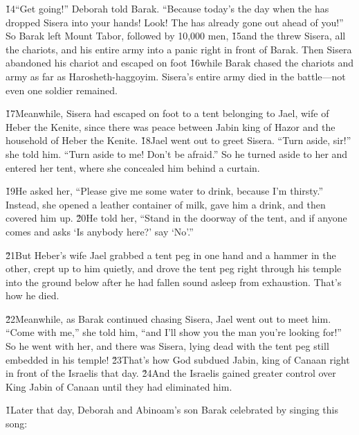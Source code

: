 \v{14}``Get going!'' Deborah told Barak. ``Because today's the day when the  has dropped Sisera into your hands! Look! The  has already gone out ahead of you!'' So Barak left Mount Tabor, followed by 10,000 men, \v{15}and the  threw Sisera, all the chariots, and his entire army into a panic right in front of Barak. Then Sisera abandoned his chariot and escaped on foot \v{16}while Barak chased the chariots and army as far as Harosheth-haggoyim. Sisera's entire army died in the battle---not even one soldier remained.

\v{17}Meanwhile, Sisera had escaped on foot to a tent belonging to Jael, wife of Heber the Kenite, since there was peace between Jabin king of Hazor and the household of Heber the Kenite. \v{18}Jael went out to greet Sisera. ``Turn aside, sir!'' she told him. ``Turn aside to me! Don't be afraid.'' So he turned aside to her and entered her tent, where she concealed him behind a curtain.

\v{19}He asked her, ``Please give me some water to drink, because I'm thirsty.'' Instead, she opened a leather container of milk, gave him a drink, and then covered him up. \v{20}He told her, ``Stand in the doorway of the tent, and if anyone comes and asks `Is anybody here?' say `No'.''

\v{21}But Heber's wife Jael grabbed a tent peg in one hand and a hammer in the other, crept up to him quietly, and drove the tent peg right through his temple into the ground below after he had fallen sound asleep from exhaustion. That's how he died.

\v{22}Meanwhile, as Barak continued chasing Sisera, Jael went out to meet him. ``Come with me,'' she told him, ``and I'll show you the man you're looking for!'' So he went with her, and there was Sisera, lying dead with the tent peg still embedded in his temple! \v{23}That's how God subdued Jabin, king of Canaan right in front of the Israelis that day. \v{24}And the Israelis gained greater control over King Jabin of Canaan until they had eliminated him.

\v{1}Later that day, Deborah and Abinoam's son Barak celebrated by singing this song:


